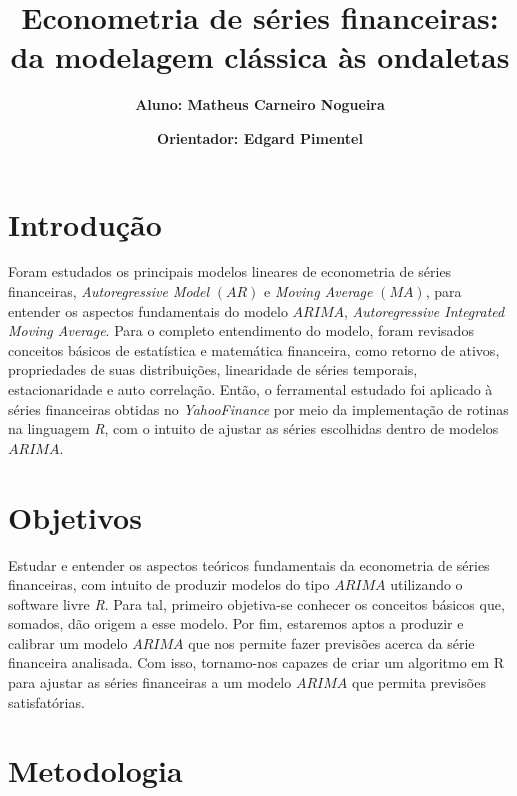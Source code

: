 \documentclass[12pt]{article}
\title{\textbf{Econometria de séries financeiras: da modelagem clássica às ondaletas}}
\author{\textbf{Aluno: Matheus Carneiro Nogueira}}
\affil{}
\author{\textbf{Orientador: Edgard Pimentel}}
\affil{}
\date{}
\begin{document}
\maketitle

\section{Introdução}\label{sec_intro}
Foram estudados os principais modelos lineares de econometria de séries financeiras,
\textit{Autoregressive Model} $ (AR) $ e \textit{Moving Average} $ (MA) $, para entender os aspectos
fundamentais do modelo $ ARIMA $, \textit{Autoregressive Integrated Moving Average}. Para o
completo entendimento do modelo, foram revisados conceitos básicos de estatística e
matemática financeira, como retorno de ativos, propriedades de suas distribuições, linearidade
de séries temporais, estacionaridade e auto correlação. Então, o ferramental estudado foi aplicado à séries financeiras obtidas no \textit{YahooFinance} por meio da implementação de rotinas na linguagem \emph{R}, com o intuito de ajustar as séries escolhidas dentro de modelos $ ARIMA $. 

\section{Objetivos}\label{sec_obje}
Estudar e entender os aspectos teóricos fundamentais da econometria de séries
financeiras, com intuito de produzir modelos do tipo $ ARIMA $ utilizando o software livre \emph{R}. Para tal, primeiro objetiva-se conhecer os conceitos básicos que, somados, dão origem a esse modelo. Por fim, estaremos
aptos a produzir e calibrar um modelo $ ARIMA $ que nos permite fazer previsões acerca da
série financeira analisada. Com isso, tornamo-nos capazes de criar um algoritmo em R para ajustar as séries financeiras a um modelo $ ARIMA $ que permita previsões satisfatórias. 


\section{Metodologia}
\end{document}
